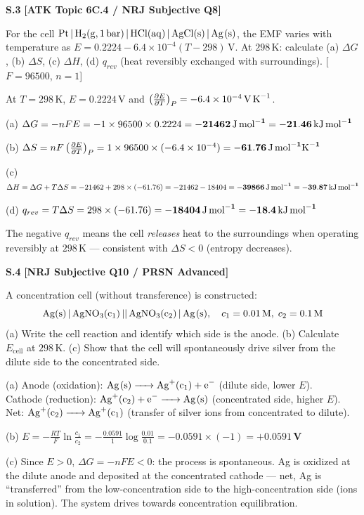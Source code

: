 \begin{problembox}
\textbf{S.3} \hfill \textbf{[ATK Topic 6C.4 / NRJ Subjective Q8]}

For the cell $\ce{Pt | H2(g, 1 bar) | HCl(aq) | AgCl(s) | Ag(s)}$, the EMF varies with temperature as $E = 0.2224 - 6.4\times10^{-4}(T-298)\,\text{V}$. At $298\,\text{K}$: calculate (a) $\Delta G$, (b) $\Delta S$, (c) $\Delta H$, (d) $q_{rev}$ (heat reversibly exchanged with surroundings). [$F = 96500$, $n=1$]
\end{problembox}
\begin{solution}
At $T = 298\,\text{K}$, $E = 0.2224\,\text{V}$ and $\left(\frac{\partial E}{\partial T}\right)_P = -6.4\times10^{-4}\,\text{V\,K}^{-1}$.

(a) $\Delta G = -nFE = -1\times96500\times0.2224 = \mathbf{-21462\,\text{J\,mol}^{-1} = -21.46\,\text{kJ\,mol}^{-1}}$

(b) $\Delta S = nF\left(\frac{\partial E}{\partial T}\right)_P = 1\times96500\times(-6.4\times10^{-4}) = \mathbf{-61.76\,\text{J\,mol}^{-1}\text{K}^{-1}}$

(c) $\Delta H = \Delta G + T\Delta S = -21462 + 298\times(-61.76) = -21462 - 18404 = \mathbf{-39866\,\text{J\,mol}^{-1} = -39.87\,\text{kJ\,mol}^{-1}}$

(d) $q_{rev} = T\Delta S = 298\times(-61.76) = \mathbf{-18404\,\text{J\,mol}^{-1} = -18.4\,\text{kJ\,mol}^{-1}}$

The negative $q_{rev}$ means the cell \textit{releases} heat to the surroundings when operating reversibly at $298\,\text{K}$ --- consistent with $\Delta S < 0$ (entropy decreases).
\end{solution}

\begin{problembox}
\textbf{S.4} \hfill \textbf{[NRJ Subjective Q10 / PRSN Advanced]}

A concentration cell (without transference) is constructed:
\[\ce{Ag(s) | AgNO3(c_1) || AgNO3(c_2) | Ag(s)}, \quad c_1 = 0.01\,\text{M},\; c_2 = 0.1\,\text{M}\]
(a) Write the cell reaction and identify which side is the anode.
(b) Calculate $E_{\text{cell}}$ at $298\,\text{K}$.
(c) Show that the cell will spontaneously drive silver from the dilute side to the concentrated side.
\end{problembox}
\begin{solution}
(a) Anode (oxidation): $\ce{Ag(s) -> Ag+(c_1) + e-}$ (dilute side, lower $E$).\\
Cathode (reduction): $\ce{Ag+(c_2) + e- -> Ag(s)}$ (concentrated side, higher $E$).\\
Net: $\ce{Ag+(c_2) -> Ag+(c_1)}$ (transfer of silver ions from concentrated to dilute).

(b) $E = -\frac{RT}{F}\ln\frac{c_1}{c_2} = -\frac{0.0591}{1}\log\frac{0.01}{0.1} = -0.0591\times(-1) = \mathbf{+0.0591\,\text{V}}$

(c) Since $E > 0$, $\Delta G = -nFE < 0$: the process is spontaneous. Ag is oxidized at the dilute anode and deposited at the concentrated cathode --- net, Ag is ``transferred'' from the low-concentration side to the high-concentration side (ions in solution). The system drives towards concentration equilibration.
\end{solution}

